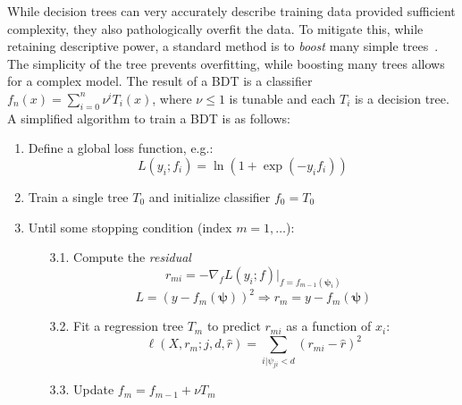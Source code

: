 While decision trees can very accurately describe training data provided sufficient complexity, they also pathologically overfit the data.
To mitigate this, while retaining descriptive power, a standard method is to \emph{boost} many simple trees~\needcite.
The simplicity of the tree prevents overfitting, while boosting many trees allows for a complex model.
The result of a BDT is a classifier $f_n(x) = \sum_{i=0}^n \nu^i T_i(x)$, where $\nu\leq 1$ is tunable and each $T_i$ is a decision tree. 
A simplified algorithm to train a BDT is as follows:
\begin{enumerate}
    \item Define a global loss function, e.g.:
        \begin{equation} L(y_i; f_i) = \ln\left(1 + \exp(-y_if_i)\right)\end{equation}
    \item Train a single tree $T_0$ and initialize classifier $f_0 = T_0$
    \item Until some stopping condition (index $m=1,\dots$):
    \begin{enumerate}
      \item[3.1.] Compute the \emph{residual}
        \begin{equation}r_{mi} = -\nabla_f L(y_i; f) |_{f=f_{m-1}(\bm\psi_i)}\end{equation}
        \begin{equation}L = (y-f_m(\bm\psi))^2 \Rightarrow r_m = y - f_m(\bm\psi) \end{equation}
      \item[3.2.] Fit a regression tree $T_m$ to predict $r_{mi}$ as a function of $x_i$:
        \begin{equation}\ell(X,r_m;j,d,\hat{r}) = \sum_{i | \psi_{ji} < d} (r_{mi} - \hat r)^2\end{equation}
      \item[3.3.] Update $f_m = f_{m-1} + \nu T_m$
    \end{enumerate}
\end{enumerate}

